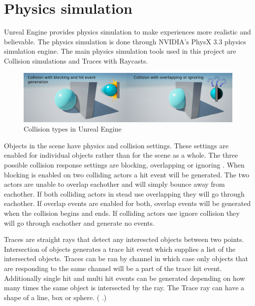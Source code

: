 \documentclass[12pt, a4paper,oneside, nocenter]{thesis}
\newcommand{\citeyeartitlexamk}[1]{(\usebibentry{#1}{title} \citeyear{#1}.)}
\begin{document}
\section{Physics simulation} \label{physics-sim-section}
Unreal Engine provides physics simulation to make experiences more realistic and believable. The physics simulation is done through NVIDIA's PhysX 3.3 physics simulation engine. The main physics simulation tools used in this project are Collision simulations and Traces with Raycasts.
\begin{figure}[H]
	\includegraphics[width=\textwidth]{collision-types}
	\caption{Collision types in Unreal Engine}
	\label{fig:collision-types}
\end{figure}
Objects in the scene have physics and collision settings. These settings are enabled for individual objects rather than for the scene as a whole. The three possible collision response settings are blocking, overlapping or ignoring . When blocking is enabled on two colliding actors a hit event will be generated. The two actors are unable to overlap eachother and will simply bounce away from eachother. If both colliding actors in stead use overlapping they will go through eachother. If overlap events are enabled for both, overlap events will be generated when the collision begins and ends. If colliding actors use ignore collision they will go through eachother and generate no events.
\par
Traces are straight rays that detect any interescted objects between two points. Intersection of objects generates a trace hit event which supplies a list of the intersected objects. Traces can be ran by channel in which case only objects that are responding to the same channel will be a part of the trace hit event. Additionally single hit and multi hit events can be generated depending on how many times the same object is intersected by the ray. The Trace ray can have a shape of a line, box or sphere. \citeyeartitlexamk{ue-traces}
\end{document}
